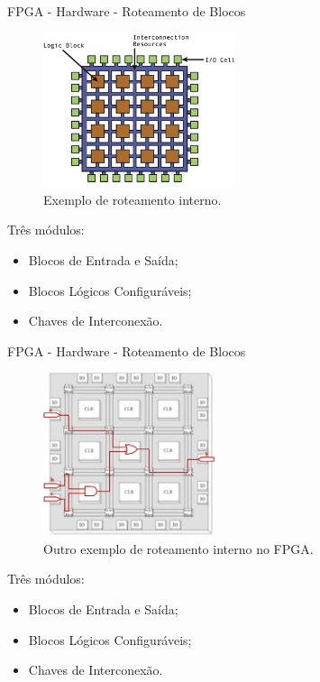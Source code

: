 	\begin{frame}{FPGA - Hardware - Roteamento de Blocos}
		\begin{multicols}{2}
			\begin{figure}[h]
				\centering
				\includegraphics[width=0.5\textwidth]{img/fpga/exempo-simples.png}
				\caption{Exemplo de roteamento interno.}
				\label{fig:exempo-simples}
			\end{figure}
			\columnbreak
			Três módulos:
			\begin{itemize}
				\setlength\itemsep{1.8em}
				\item Blocos de Entrada e Saída;

				\item Blocos Lógicos Configuráveis;

				\item Chaves de Interconexão.
			\end{itemize}
		\end{multicols}
	\end{frame}

	\begin{frame}{FPGA - Hardware - Roteamento de Blocos}
		\begin{multicols}{2}
			\begin{figure}[h]
				\centering
				\includegraphics[width=0.45\textwidth]{img/fpga/exemplo.jpg}
				\caption{Outro exemplo de roteamento interno no FPGA.}
				\label{fig:exemplo}
			\end{figure}
			\columnbreak
			Três módulos:
			\begin{itemize}
				\setlength\itemsep{1.8em}
				\item Blocos de Entrada e Saída;

				\item Blocos Lógicos Configuráveis;

				\item Chaves de Interconexão.
			\end{itemize}
		\end{multicols}
	\end{frame}

